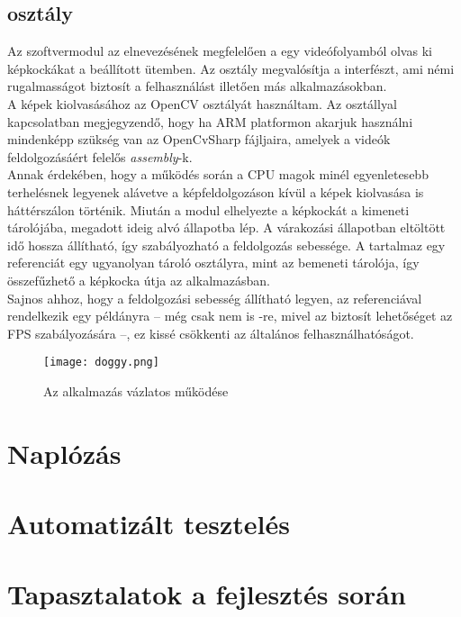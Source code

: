 \subsection{ osztály}

Az szoftvermodul az elnevezésének megfelelően a egy videófolyamból olvas ki képkockákat a beállított ütemben. Az osztály megvalósítja a  interfészt, ami némi rugalmasságot biztosít a felhasználást illetően más alkalmazásokban. \\
A képek kiolvasásához az OpenCV  osztályát használtam. Az osztállyal kapcsolatban megjegyzendő, hogy ha ARM platformon akarjuk használni mindenképp szükség van az OpenCvSharp  fájljaira, amelyek a videók feldolgozásáért felelős \textit{assembly}-k.\\
Annak érdekében, hogy a működés során a CPU magok minél egyenletesebb terhelésnek legyenek alávetve a képfeldolgozáson kívül a képek kiolvasása is háttérszálon történik. Miután a modul elhelyezte a képkockát a kimeneti tárolójába, megadott ideig alvó állapotba lép. A várakozási állapotban eltöltött idő hossza állítható, így szabályozható a feldolgozás sebessége. A  tartalmaz egy referenciát egy ugyanolyan tároló osztályra, mint az  bemeneti tárolója, így összefűzhető a képkocka útja az alkalmazásban.\\
Sajnos ahhoz, hogy a feldolgozási sebesség állítható legyen, az  referenciával rendelkezik egy  példányra -- még csak nem is -re, mivel az biztosít lehetőséget az FPS szabályozására --, ez kissé csökkenti az általános felhasználhatóságot.

\begin{figure}[h]
\texttt{[image: doggy.png]}
\centering
\caption{Az alkalmazás vázlatos működése}
\label{fig:doggy}
\end{figure}

\section{Naplózás}

\section{Automatizált tesztelés}


\section{Tapasztalatok a fejlesztés során}

